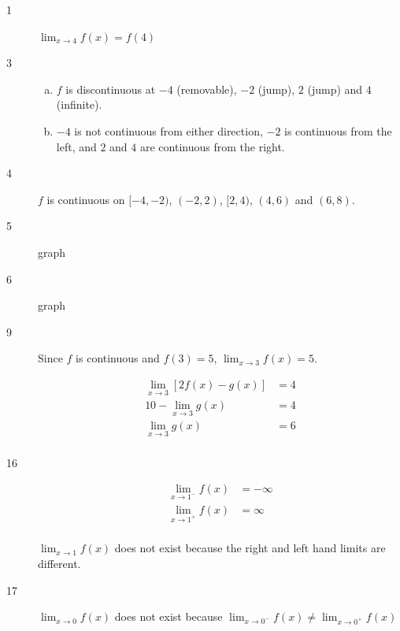 \documentclass[letterpaper, landscape]{exam}
\begin{document}
    \begin{description}

      \item[1] $\lim_{x \to 4} f(x) = f(4)$

      \item[3] 
        \begin{enumerate}[(a)]
          \item $f$ is discontinuous at $-4$ (removable), $-2$ (jump), $2$ (jump) and 
            $4$ (infinite). 

          \item $-4$ is not continuous from either direction, $-2$ is continuous from the
            left, and $2$ and $4$ are continuous from the right.

        \end{enumerate}

      \item[4] $f$ is continuous on $[-4, -2)$, $(-2, 2)$, $[2, 4)$, $(4, 6)$ 
          and $(6, 8)$.

      \item[5] graph

      \item[6] graph

      \item[9] Since $f$ is continuous and $f(3) = 5$, $\lim_{x \to 3} f(x) = 5$.

        \begin{align*}
          \lim_{x \to 3} \left[ 2 f(x) - g(x) \right] & = 4 \\
          10 - \lim_{x \to 3} g(x)                    & = 4 \\
          \lim_{x \to 3} g(x)                         & = \boxed{ 6 } \\
        \end{align*}

      \item[16] 
        \begin{align*}
          \lim_{x \to 1^-} f(x) & = - \infty \\
          \lim_{x \to 1^+} f(x) & = \infty \\
        \end{align*}

        $\lim_{x \to 1} f(x)$ does not exist because the right and left hand limits are
        different.

      \item[17] 
        $\lim_{x \to 0} f(x)$ does not exist because 
        $\lim_{x \to 0^-} f(x) \neq \lim_{x \to 0^+} f(x)$


\end{description}
\end{document}
